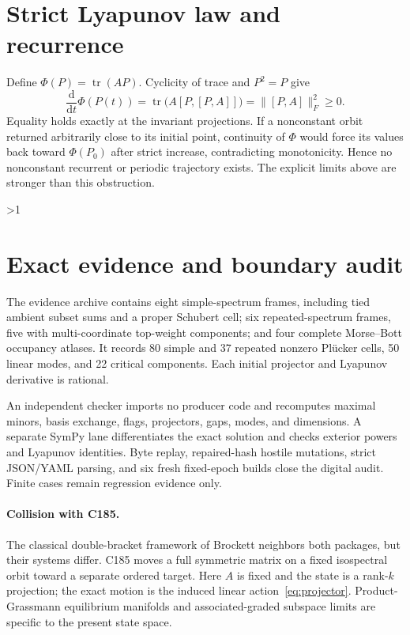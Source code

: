 \documentclass[10pt]{article}
\providecommand{\CRevisionRound}{2}
\newcommand{\tr}{\operatorname{tr}}
\newcommand{\dd}{\mathrm d}
\begin{document}
\section{Strict Lyapunov law and recurrence}
Define $\Phi(P)=\tr(AP)$.  Cyclicity of trace and $P^2=P$ give
\begin{equation}\label{eq:lyapunov}
 \frac{\dd}{\dd t}\Phi(P(t))
 =\tr\bigl(A[P,[P,A]]\bigr)
 =\lVert[P,A]\rVert_F^2\ge0.
\end{equation}
Equality holds exactly at the invariant projections.  If a nonconstant orbit
returned arbitrarily close to its initial point, continuity of $\Phi$ would
force its values back toward $\Phi(P_0)$ after strict increase, contradicting
monotonicity.  Hence no nonconstant recurrent or periodic trajectory exists.
The explicit limits above are stronger than this obstruction.

\ifnum\CRevisionRound>1
\section{Exact evidence and boundary audit}
The evidence archive contains eight simple-spectrum frames, including tied
ambient subset sums and a proper Schubert cell; six repeated-spectrum frames,
five with multi-coordinate top-weight components; and four complete
Morse--Bott occupancy atlases.  It records 80 simple and 37 repeated nonzero
Pl\"ucker cells, 50 linear modes, and 22 critical components.  Each initial
projector and Lyapunov derivative is rational.

An independent checker imports no producer code and recomputes maximal minors,
basis exchange, flags, projectors, gaps, modes, and dimensions.  A separate
SymPy lane differentiates the exact solution and checks exterior powers and
Lyapunov identities.  Byte replay, repaired-hash hostile mutations, strict
JSON/YAML parsing, and six fresh fixed-epoch builds close the digital audit.
Finite cases remain regression evidence only.

\paragraph{Collision with C185.}
The classical double-bracket framework of Brockett neighbors
both packages, but their systems differ.  C185 moves a full symmetric matrix
on a fixed isospectral orbit toward a separate ordered target.  Here $A$ is
fixed and the state is a rank-$k$ projection; the exact motion is the induced
linear action~\eqref{eq:projector}.  Product-Grassmann equilibrium manifolds
and associated-graded subspace limits are specific to the present state space.
\end{document}
